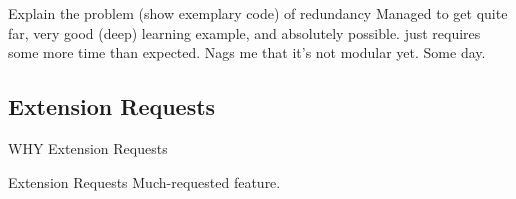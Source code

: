 \begin{frame}[c]
    Explain the problem (show exemplary code) of redundancy
    Managed to get quite far, very good (deep) learning example, and absolutely
    possible. just requires some more time than expected.
    Nags me that it's not modular yet. Some day.
\end{frame}


\subsection{Extension Requests}

\begin{frame}[c]
    WHY Extension Requests
\end{frame}

\begin{frame}[c]{Extension Requests}
    Much-requested feature.
\end{frame}
